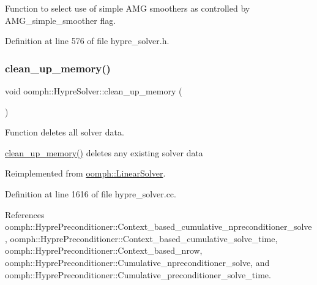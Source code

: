 Function to select use of \textquotesingle{}simple\textquotesingle{} A\+MG smoothers as controlled by A\+M\+G\+\_\+simple\+\_\+smoother flag. 



Definition at line 576 of file hypre\+\_\+solver.\+h.

\mbox{\label{classoomph_1_1HypreSolver_a5c1a57f1f74c0748a47c1629635ee0fc}} 
\subsubsection{\texorpdfstring{clean\+\_\+up\+\_\+memory()}{clean\_up\_memory()}}
{\footnotesize\ttfamily void oomph\+::\+Hypre\+Solver\+::clean\+\_\+up\+\_\+memory (\begin{DoxyParamCaption}{ }\end{DoxyParamCaption})\hspace{0.3cm}{\ttfamily [virtual]}}



Function deletes all solver data. 

\hyperlink{classoomph_1_1HypreSolver_a5c1a57f1f74c0748a47c1629635ee0fc}{clean\+\_\+up\+\_\+memory()} deletes any existing solver data 

Reimplemented from \hyperlink{classoomph_1_1LinearSolver_a9d66f3262e80ca06a365f98216afd85f}{oomph\+::\+Linear\+Solver}.



Definition at line 1616 of file hypre\+\_\+solver.\+cc.



References oomph\+::\+Hypre\+Preconditioner\+::\+Context\+\_\+based\+\_\+cumulative\+\_\+npreconditioner\+\_\+solve, oomph\+::\+Hypre\+Preconditioner\+::\+Context\+\_\+based\+\_\+cumulative\+\_\+solve\+\_\+time, oomph\+::\+Hypre\+Preconditioner\+::\+Context\+\_\+based\+\_\+nrow, oomph\+::\+Hypre\+Preconditioner\+::\+Cumulative\+\_\+npreconditioner\+\_\+solve, and oomph\+::\+Hypre\+Preconditioner\+::\+Cumulative\+\_\+preconditioner\+\_\+solve\+\_\+time.

\mbox{\label{classoomph_1_1HypreSolver_ae97158e3b4fca00cc15d0baa4c5444d4}} 
